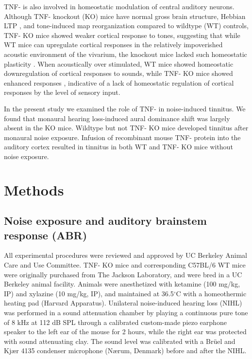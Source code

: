 TNF-\textalpha{} is also involved in homeostatic modulation of central auditory neurons. Although TNF-\textalpha{} knockout (KO) mice have normal gross brain structure, Hebbian LTP \cite{Kaneko2008}, and tone-induced map reorganization \cite{Yang2013} compared to wildtype (WT) controls, TNF-\textalpha{} KO mice showed weaker cortical response to tones, suggesting that while WT mice can upregulate cortical responses in the relatively impoverished acoustic environment of the vivarium, the knockout mice lacked such homeostatic plasticity \cite{Yang2013}. When acoustically over stimulated, WT mice showed homeostatic downregulation of cortical responses to sounds, while TNF-\textalpha{} KO mice showed enhanced responses \cite{Yang2013}, indicative of a lack of homeostatic regulation of cortical responses by the level of sensory input.

In the present study we examined the role of TNF-\textalpha{} in noise-induced tinnitus. We found that monaural hearing loss-induced aural dominance shift was largely absent in the KO mice. Wildtype but not TNF-\textalpha{} KO mice developed tinnitus after monaural noise exposure. Infusion of recombinant mouse TNF-\textalpha{} protein into the auditory cortex resulted in tinnitus in both WT and TNF-\textalpha{} KO mice without noise exposure.

\section{Methods}

\subsection{Noise exposure and auditory brainstem response (ABR)}
All experimental procedures were reviewed and approved by UC Berkeley Animal Care and Use Committee. TNF-\textalpha{} KO mice and corresponding C57BL/6 WT mice were originally purchased from The Jackson Laboratory, and were bred in a UC Berkeley animal facility. Animals were anesthetized with ketamine (100 mg/kg, IP) and xylazine (10 mg/kg, IP), and maintained at 36.5$^\circ$C with a homeothermic heating pad (Harvard Apparatus). Unilateral noise-induced hearing loss (NIHL) was performed in a sound attenuation chamber by playing a continuous pure tone of 8 kHz at 112 dB SPL through a calibrated custom-made piezo earphone speaker to the left ear of the mouse for 2 hours, while the right ear was protected with sound attenuating clay. The sound level was calibrated with a Br\"uel and Kj\ae r 4135 condenser microphone (N\ae rum, Denmark) before and after the NIHL.

